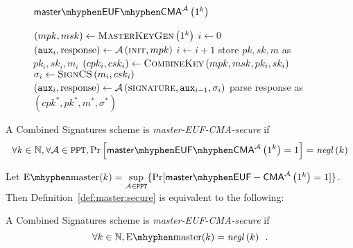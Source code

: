     \begin{figure}[H]
      \begin{gamebox}{$\mathsf{master \mhyphen EUF \mhyphen
      CMA}^{\adversary}\left(1^k\right)$}
        \begin{algorithmic}[1]
          \State $\left(mpk, msk\right) \gets
          \textsc{MasterKeyGen}\left(1^k\right)$
          \State $i \gets 0$
          \State $\left(\mathtt{aux}_i, \mathrm{response}\right) \gets
          \mathcal{A}\left(\textsc{init}, mpk\right)$
            \State $i \gets i + 1$
            \State store $pk, sk, m$ as $pk_i, sk_i, m_i$
            \State $\left(cpk_i, csk_i\right) \gets
            \textsc{CombineKey}\left(mpk, msk, pk_i, sk_i\right)$
            \State $\sigma_i \gets \textsc{SignCS}\left(m_i, csk_i\right)$
            \State $\left(\mathtt{aux}_i, \mathrm{response}\right) \gets
            \mathcal{A}\left(\textsc{signature}, \mathtt{aux}_{i-1},
            \sigma_i\right)$
          \EndWhile
          \State parse response as $\left(cpk^*, pk^*, m^*, \sigma^*\right)$
            \State {}
          \Else
            \State {}
          \EndIf
        \end{algorithmic}
      \end{gamebox}
      \caption{}
      \label{game:comb:master}
    \end{figure}
    \begin{definition}
      \label{def:master:secure}
      A Combined Signatures scheme is \emph{\textsf{master-EUF-CMA}-secure} if
      \begin{equation*}
        \forall k \in \mathbb{N}, \forall \adversary \in \mathtt{PPT},
        \Pr\left[\mathsf{master \mhyphen EUF \mhyphen
        CMA}^{\adversary}\left(1^k\right) = 1\right] =
        \mathit{negl}\left(k\right)
      \end{equation*}
    \end{definition}

    Let $\mathrm{E \mhyphen master}(k) = \underset{\adversary \in
    \mathtt{PPT}}{\sup}\{\Pr[\mathsf{master \mhyphen
    EUF-CMA}^{\adversary}\left(1^k\right) = 1]\}$. Then
    Definition~\ref{def:master:secure} is equivalent to the following:

    \begin{definition}
      \label{def:master:secure:sup}
      A Combined Signatures scheme is \emph{\textsf{master-EUF-CMA}-secure} if
      \begin{equation*}
        \forall k \in \mathbb{N}, \mathrm{E \mhyphen master}(k) =
        \mathit{negl}\left(k\right) \enspace.
      \end{equation*}
    \end{definition}

